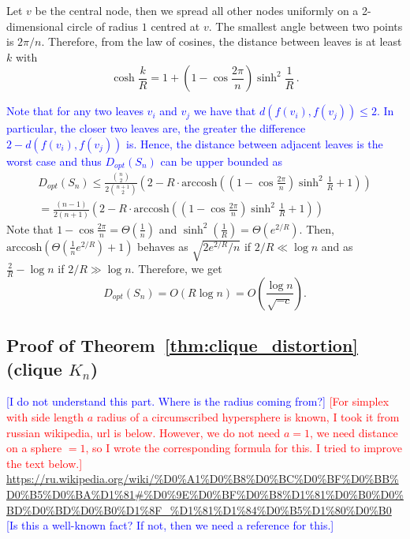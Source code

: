 \documentclass{article} %
\newcommand{\ph}[1]{\textcolor{blue}{#1}}
\newcommand{\lt}[1]{\textcolor{red}{#1}}
\begin{document}
Let $v$ be the central node, then we spread all other nodes uniformly on a 2-dimensional circle of radius $1$ centred at $v$. The smallest angle between two points is $2 \pi / n$. Therefore, from the law of cosines, the distance between leaves is at least $k$ with
\[
\cosh \frac{k}{R} = 1  + \left(1 -  \cos \frac{2 \pi}{n}\right)  \sinh^2 \frac{1}{R} \,.
\]

\ph{Note that for any two leaves $v_i$ and $v_j$ we have that $d(f(v_i), f(v_j)) \le 2$. In particular, the closer two leaves are, the greater the difference $2 - d(f(v_i), f(v_j))$ is. Hence, the distance between adjacent leaves is the worst case and thus $D_{opt}(S_n)$ can be upper bounded as}
\begin{multline*}
D_{opt}(S_n) \le \frac{{n \choose 2}}{2{n+1\choose 2}} \left(2 - R\cdot \mathrm{arccosh}\left( \left(1 - \cos \frac{2 \pi}{n}\right)\sinh^2\frac{1}{R}  + 1 \right)\right) \\
= \frac{(n-1)}{2(n+1)} \left(2 - R\cdot \mathrm{arccosh}\left( \left(1 - \cos \frac{2 \pi}{n}\right)\sinh^2\frac{1}{R}  + 1 \right)\right)
\end{multline*}
Note that $1 - \cos\frac{2\pi}{n} = \Theta\left(\frac{1}{n}\right)$ and $\sinh^2\left(\frac{1}{R}\right) = \Theta\left(e^{2/R}\right)$.
Then, $\textrm{arccosh}\left(\Theta\left(\frac{1}{n} e^{2/R}\right) + 1 \right)$ behaves as $\sqrt{2e^{2/R}/n}$ if $2/R \ll \log n$ and as $\frac{2}{R} - \log n$ if $2/R \gg \log n$.
Therefore, we get
\[
D_{opt}(S_n) = O\left( R \log n \right) = O\left( \frac{\log n}{\sqrt{-c}} \right).
\]

\subsection{Proof of Theorem~\ref{thm:clique_distortion} (clique $K_n$)}

\ph{[I do not understand this part. Where is the radius coming from?]}
\lt{[For simplex with side length $a$ radius of a circumscribed hypersphere is known, I took it from russian wikipedia, url is below. However, we do not need $a = 1$, we need distance on a sphere $= 1$, so I wrote the corresponding formula for this. I tried to improve the text below.]}
\url{https://ru.wikipedia.org/wiki/%D0%A1%D0%B8%D0%BC%D0%BF%D0%BB%D0%B5%D0%BA%D1%81#%D0%9E%D0%BF%D0%B8%D1%81%D0%B0%D0%BD%D0%BD%D0%B0%D1%8F_%D1%81%D1%84%D0%B5%D1%80%D0%B0}
\ph{[Is this a well-known fact? If not, then we need a reference for this.]}
\end{document}
